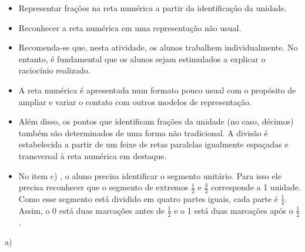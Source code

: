 \begin{multicols}{2}
\begin{objetivos}[label=chap3-ativ10]{}{}
\begin{itemize} %
    \item       Representar frações na reta numérica a partir da identificação da unidade.
    \item       Reconhecer a reta numérica em uma representação não usual.
\end{itemize} %
\end{objetivos}

\begin{orientacoes}{}{}
\begin{itemize} %
    \item       Recomenda-se que, nesta atividade, os alunos trabalhem individualmente. No entanto, é fundamental que os alunos sejam estimulados a explicar o raciocínio realizado.
    \item       A reta numérica é apresentada num formato pouco usual com o propósito de ampliar e variar o contato com outros modelos de representação.
    \item       Além disso, os pontos que identificam frações da unidade (no caso, décimos) também são determinados de uma forma não tradicional. A divisão é estabelecida a partir de um feixe de retas paralelas igualmente espaçadas e transversal à reta numérica em destaque.
    \item       No item c) , o aluno precisa identificar o segmento unitário. Para isso ele precisa reconhecer que o segmento de extremos $\frac{1}{2}$ e $\frac{3}{2}$ corresponde a 1 unidade. Como esse segmento está dividido em quatro partes iguais, cada parte é $\frac{1}{4}$. Assim, o 0 está duas marcações antes de $\frac{1}{2}$ e o 1 está duas marcações após o $\frac{1}{2}$.
\end{itemize} %
\end{orientacoes}

\begin{solucao}{}{}

a)

\end{solucao}
\end{multicols}
